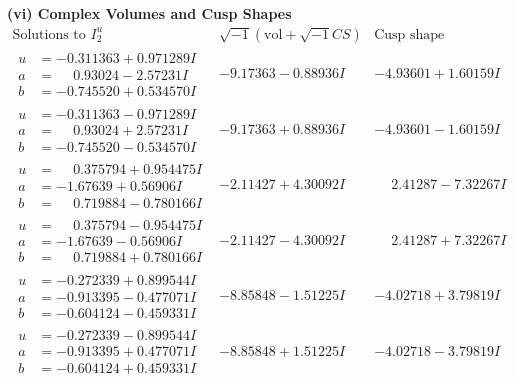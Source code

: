 \documentclass[1p]{elsarticle_modified}
\theoremstyle{definition}
\newcommand{\I}{\sqrt{-1}}
\begin{document}
\newpage\flushleft \textbf{(vi) Complex Volumes and Cusp Shapes}
$$\begin{array}{c|c|c}  
\text{Solutions to }I^u_{2}& \I (\text{vol} + \sqrt{-1}CS) & \text{Cusp shape}\\
 \hline 
\begin{aligned}
u &= -0.311363 + 0.971289 I \\
a &= \phantom{-}0.93024 - 2.57231 I \\
b &= -0.745520 + 0.534570 I\end{aligned}
 & -9.17363 - 0.88936 I & -4.93601 + 1.60159 I \\ \hline\begin{aligned}
u &= -0.311363 - 0.971289 I \\
a &= \phantom{-}0.93024 + 2.57231 I \\
b &= -0.745520 - 0.534570 I\end{aligned}
 & -9.17363 + 0.88936 I & -4.93601 - 1.60159 I \\ \hline\begin{aligned}
u &= \phantom{-}0.375794 + 0.954475 I \\
a &= -1.67639 + 0.56906 I \\
b &= \phantom{-}0.719884 - 0.780166 I\end{aligned}
 & -2.11427 + 4.30092 I & \phantom{-}2.41287 - 7.32267 I \\ \hline\begin{aligned}
u &= \phantom{-}0.375794 - 0.954475 I \\
a &= -1.67639 - 0.56906 I \\
b &= \phantom{-}0.719884 + 0.780166 I\end{aligned}
 & -2.11427 - 4.30092 I & \phantom{-}2.41287 + 7.32267 I \\ \hline\begin{aligned}
u &= -0.272339 + 0.899544 I \\
a &= -0.913395 - 0.477071 I \\
b &= -0.604124 - 0.459331 I\end{aligned}
 & -8.85848 - 1.51225 I & -4.02718 + 3.79819 I \\ \hline\begin{aligned}
u &= -0.272339 - 0.899544 I \\
a &= -0.913395 + 0.477071 I \\
b &= -0.604124 + 0.459331 I\end{aligned}
 & -8.85848 + 1.51225 I & -4.02718 - 3.79819 I \\ \hline\begin{aligned}

\end{aligned}
\end{array}$$
\end{document}
